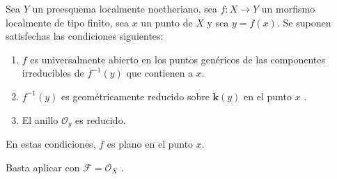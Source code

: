 \begin{corollary}[15.2.3]
\label{IV.15.2.3}
Sea $Y$ un preesquema localmente noetheriano, sea $f:X\to Y$ un morfismo localmente de tipo finito, sea $x$ un punto de $X$ y sea $y=f(x)$.
Se suponen satisfechas las condiciones siguientes:
\begin{enumerate}[label=\textup{(\roman*)}]
  \item $f$ es universalmente abierto en los puntos genéricos de las componentes irreducibles de $f^{-1}(y)$ que contienen a $x$.
  \item $f^{-1}(y)$ es geométricamente reducido sobre $\boldsymbol{k}(y)$ en el punto $x$ .
  \item El anillo $\mathcal O_y$ es reducido.
\end{enumerate}
En estas condiciones, $f$ es plano en el punto $x$.
\end{corollary}

Basta aplicar  con $\mathcal F=\mathcal O_X$ .


